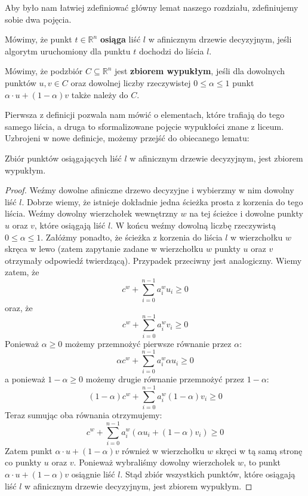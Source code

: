 Aby było nam łatwiej zdefiniować główny lemat naszego rozdziału, zdefiniujemy sobie dwa pojęcia.
\begin{definition}
 Mówimy, że punkt $t \in \mathbb{R}^n$ \textbf{osiąga} liść $l$ w afinicznym drzewie decyzyjnym, jeśli algorytm uruchomiony dla punktu $t$ dochodzi do liścia $l$.
\end{definition}
\begin{definition}
 Mówimy, że podzbiór $C \subseteq \mathbb{R}^n$ jest \textbf{zbiorem wypukłym}, jeśli dla dowolnych punktów $u, v \in C$ oraz dowolnej liczby rzeczywistej $0 \leq \alpha \leq 1$ punkt $\alpha \cdot u + (1 - \alpha) v$ także należy do $C$.
\end{definition}
Pierwsza z definicji pozwala nam mówić o elementach, które trafiają do tego samego liścia, a druga to sformalizowane pojęcie wypukłości znane z liceum.
Uzbrojeni w nowe definicje, możemy przejść do obiecanego lematu:

\begin{lemma}
 Zbiór punktów osiągających liść $l$ w afinicznym drzewie decyzyjnym, jest zbiorem wypukłym.
 \label{uniqueness-lemma}
\end{lemma}

\begin{proof}
 Weźmy dowolne afiniczne drzewo decyzyjne i wybierzmy w nim dowolny liść $l$.
 Dobrze wiemy, że istnieje dokładnie jedna ścieżka prosta z korzenia do tego liścia.
 Weźmy dowolny wierzchołek wewnętrzny $w$ na tej ścieżce i dowolne punkty $u$ oraz $v$, które osiągają liść $l$.
 W końcu weźmy dowolną liczbę rzeczywistą $0 \leq \alpha \leq 1$.
 Załóżmy ponadto, że ścieżka z korzenia do liścia $l$ w wierzchołku $w$ skręca w lewo (zatem zapytanie zadane w wierzchołku $w$ punkty $u$ oraz $v$ otrzymały odpowiedź twierdzącą).
 Przypadek przeciwny jest analogiczny.
 Wiemy zatem, że
\[
 c^w + \sum_{i=0}^{n-1} a_i^w u_i \geq 0
\]
 oraz, że
\[
 c^w + \sum_{i=0}^{n-1} a_i^w v_i \geq 0
\]
 Ponieważ $\alpha \geq 0$ możemy przemnożyć pierwsze równanie przez $\alpha$:
\[
 \alpha c^w + \sum_{i=0}^{n-1} a_i^w \alpha u_i \geq 0
\]
 a ponieważ $1 - \alpha \geq 0$ możemy drugie równanie przemnożyć przez $1 - \alpha$:
\[
 (1 - \alpha) c^w + \sum_{i=0}^{n-1} a_i^w (1 - \alpha) v_i \geq 0
\]
Teraz sumując oba równania otrzymujemy:
\[
 c^w + \sum_{i=0}^{n-1} a_i^w (\alpha u_i + (1 - \alpha) v_i) \geq 0
\]
Zatem punkt $\alpha \cdot u + (1 - \alpha) v$ również w wierzchołku $w$ skręci w tą samą stronę co punkty $u$ oraz $v$.
Ponieważ wybraliśmy dowolny wierzchołek $w$, to punkt $\alpha \cdot u + (1 - \alpha) v$ osiągnie liść $l$.
Stąd zbiór wszystkich punktów, które osiągają liść $l$ w afinicznym drzewie decyzyjnym, jest zbiorem wypukłym.
\end{proof}

